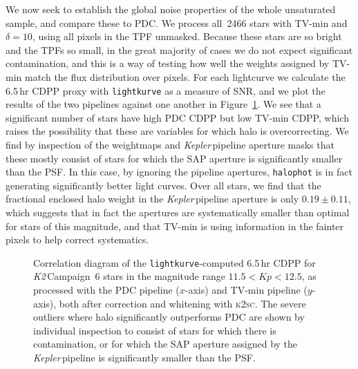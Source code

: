 \documentclass[modern]{aastex62}
\newcommand\kepler{\emph{Kepler}\,}
\newcommand\ktwo{\emph{K2}\,}
\begin{document}
\begin{figure*}
\caption{The eight transiting single-planet systems in \ktwo Campaign~6 in the magnitude range $11.5 < Kp < 12.5$, with PDC light curves (blue) and TV-min light curves (orange) overlaid. These have been identically \textsc{k2sc}-corrected, whitened, outlier-clipped, folded and binned as described in Section~\ref{sec:benchmarking}. The depths and shapes of the transits agree closely except for EPIC~212460519, for which the TV-min transit is slightly shallower, and EPIC~212555594, for which TV-min is significantly shallower.}
\label{fig:planets}
\end{figure*}

We now seek to establish the global noise properties of the whole unsaturated sample, and compare these to PDC. We process all~2466 stars with TV-min and $\delta = 10$, using all pixels in the TPF unmasked. Because these stars are so bright and the TPFs so small, in the great majority  of cases we do not expect significant contamination, and this is a way of testing how well the weights assigned by TV-min match the flux distribution over pixels. For each lightcurve we calculate the 6.5\,hr CDPP proxy with \texttt{lightkurve} as a measure of SNR, and we plot the results of the two pipelines against one another in Figure~\ref{fig:halovspdc}. We see that a significant number of stars have high PDC CDPP but low TV-min CDPP, which raises the possibility that these are variables for which halo is overcorrecting. We find by inspection of the weightmaps and \kepler pipeline aperture masks that these mostly consist of stars for which the SAP aperture is significantly smaller than the PSF. In this case, by ignoring the pipeline apertures, \texttt{halophot} is in fact generating significantly better light curves. Over all stars, we find that the fractional enclosed halo weight in the \kepler pipeline aperture is only $0.19 \pm 0.11$, which suggests that in fact the apertures are systematically smaller than optimal for stars of this magnitude, and that TV-min is using information in the fainter pixels to help correct systematics.

\begin{figure}
\caption{Correlation diagram of the \texttt{lightkurve}-computed 6.5\,hr CDPP for \ktwo Campaign~6 stars in the magnitude range $11.5 < Kp < 12.5$, as processed with the PDC pipeline ($x$-axis) and TV-min pipeline ($y$-axis), both after correction and whitening with \textsc{k2sc}. The severe outliers where halo significantly outperforms PDC are shown by individual inspection to consist of stars for which there is contamination, or for which the SAP aperture assigned by the \kepler pipeline is significantly smaller than the PSF.}
\label{fig:halovspdc}
\end{figure}
\end{document}
